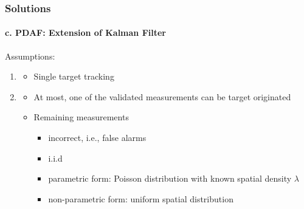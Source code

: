 \begin{frame}
\frametitle{Solutions}
\framesubtitle{c. PDAF: Extension of Kalman Filter}
\mypagenum
Assumptions:
\begin{enumerate}
\item  {\color{red}{Number of targets}}
\begin{itemize}
\item Single target tracking
\end{itemize}
\item {\color{red}{False alarms}}
\begin{itemize} 
\item At most, one of the validated measurements can be target originated	
\item Remaining measurements
\begin{itemize}
\item incorrect, i.e., false alarms
\item i.i.d
\item parametric form: Poisson distribution with known spatial density $\lambda$
\item non-parametric form: uniform spatial distribution
\end{itemize}
\end{itemize}
\end{enumerate}
\end{frame}







